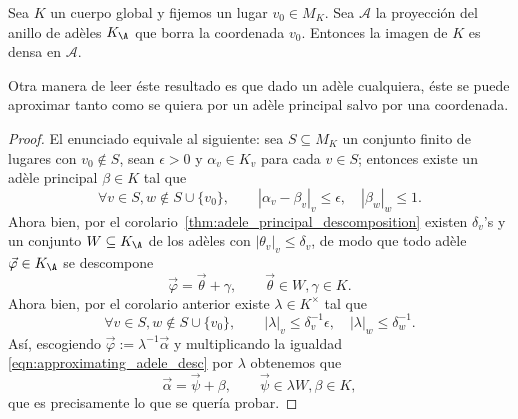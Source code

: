 \documentclass[teoria-numeros.tex]{subfiles}
\begin{document}
\begin{thm}
	Sea $K$ un cuerpo global y fijemos un lugar $v_0 \in M_K$.
	Sea $\mathcal{A}$ la proyección del anillo de adèles $K_\A$ que borra la coordenada $v_0$.
	Entonces la imagen de $K$ es densa en $\mathcal{A}$.
\end{thm}
Otra manera de leer éste resultado es que dado un adèle cualquiera, éste se puede aproximar tanto como se quiera por un adèle principal
salvo por una coordenada.
\begin{proof}
	El enunciado equivale al siguiente:
	sea $S \subseteq M_K$ un conjunto finito de lugares con $v_0 \notin S$, sean $\epsilon > 0$ y $\alpha_v \in K_v$ para cada $v \in S$;
	entonces existe un adèle principal $\beta \in K$ tal que
	\[
		\forall v\in S, w \notin S \cup \{ v_0 \}, \qquad |\alpha_v - \beta_v|_v \le \epsilon, \quad |\beta_w|_w \le 1.
	\]
	Ahora bien, por el corolario~\ref{thm:adele_principal_descomposition} existen $\delta_v$'s y un conjunto $W \subseteq K_\A$ de los adèles
	con $|\theta_v|_v \le \delta_v$, de modo que todo adèle $\vec\varphi \in K_\A$ se descompone
	\begin{equation}
		\vec\varphi = \vec\theta + \gamma, \qquad \vec\theta \in W, \gamma \in K.
		\label{eqn:approximating_adele_desc}
	\end{equation}
	Ahora bien, por el corolario anterior existe $\lambda \in K^\times$ tal que
	\[
		\forall v\in S, w \notin S \cup \{ v_0 \}, \qquad |\lambda|_v \le \delta_v^{-1}\epsilon, \quad |\lambda|_w \le \delta_w^{-1}.
	\]
	Así, escogiendo $\vec\varphi := \lambda^{-1}\vec\alpha$ y multiplicando la igualdad \eqref{eqn:approximating_adele_desc} por $\lambda$ obtenemos que
	$$ \vec\alpha = \vec\psi + \beta, \qquad \vec\psi \in \lambda W, \beta \in K, $$
	que es precisamente lo que se quería probar.
\end{proof}
\end{document}
